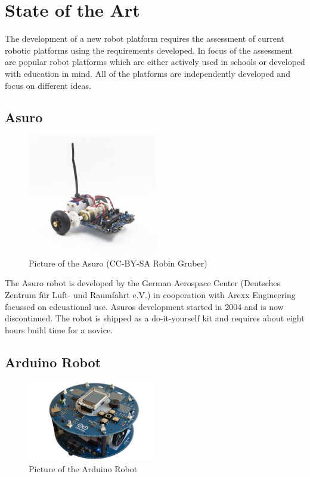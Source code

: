 \documentclass[twocolumn]{article}
\newcounter{starnumber}
\newcommand{\stars}[1]{
  \forloop{starnumber}{1}{\value{starnumber} < {#1+1}}{\ding{72}}
  
}
\begin{document}
\section{State of the Art}
The development of a new robot platform requires the assessment of current robotic platforms using the requirements developed. In focus of the assessment are popular robot platforms which are either actively used in schools or developed with education in mind. All of the platforms are independently developed and focus on different ideas. 

\subsection{Asuro}
\begin{figure}[h!]
  \centering
  \includegraphics[width=0.5\textwidth]{images/asuro.jpg}
  \caption{Picture of the Asuro (CC-BY-SA Robin Gruber)}
\end{figure}

The Asuro robot is developed by the German Aerospace Center (Deutsches Zentrum für Luft- und Raumfahrt e.V.) in cooperation with Arexx Engineering focussed on edcuational use. Asuros development started in 2004 and is now discontinued. The robot is shipped as a do-it-yourself kit and requires about eight hours build time for a novice. 

\stars{5}

\subsection{Arduino Robot}
\begin{figure}[h!]
  \centering
  \includegraphics[width=0.5\textwidth]{images/arduinorobot.jpg}
  \caption{Picture of the Arduino Robot}
\end{figure}
\end{document}
